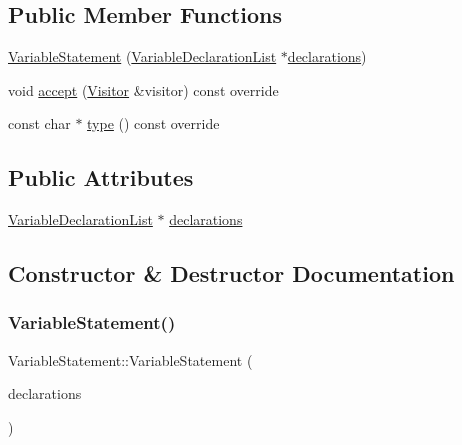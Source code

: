 \subsection*{Public Member Functions}
\begin{DoxyCompactItemize}
\item 
\hyperlink{struct_variable_statement_a1ebce27ac048580b3a41723a2defd46a}{Variable\+Statement} (\hyperlink{struct_variable_declaration_list}{Variable\+Declaration\+List} $\ast$\hyperlink{struct_variable_statement_a9d1cdb228d5cb079e228180532cec942}{declarations})
\item 
void \hyperlink{struct_variable_statement_a55446c8cfa8fd620de4b72f7efca86bd}{accept} (\hyperlink{struct_visitor}{Visitor} \&visitor) const override
\item 
const char $\ast$ \hyperlink{struct_variable_statement_ae3097fcbff760d955e04d84ddb111214}{type} () const override
\end{DoxyCompactItemize}
\subsection*{Public Attributes}
\begin{DoxyCompactItemize}
\item 
\hyperlink{struct_variable_declaration_list}{Variable\+Declaration\+List} $\ast$ \hyperlink{struct_variable_statement_a9d1cdb228d5cb079e228180532cec942}{declarations}
\end{DoxyCompactItemize}


\subsection{Constructor \& Destructor Documentation}
\mbox{\label{struct_variable_statement_a1ebce27ac048580b3a41723a2defd46a}} 
\subsubsection{\texorpdfstring{Variable\+Statement()}{VariableStatement()}}
{\footnotesize\ttfamily Variable\+Statement\+::\+Variable\+Statement (\begin{DoxyParamCaption}\item[{\hyperlink{struct_variable_declaration_list}{Variable\+Declaration\+List} $\ast$}]{declarations }\end{DoxyParamCaption})\hspace{0.3cm}{\ttfamily [inline]}}



